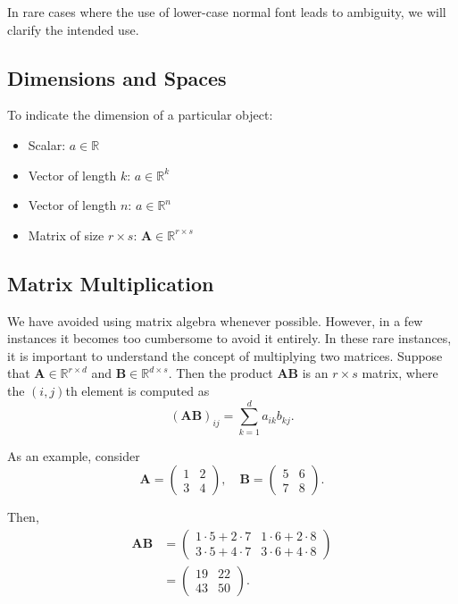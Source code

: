 In rare cases where the use of lower-case normal font leads to ambiguity, we will clarify the intended use.

\subsection{Dimensions and Spaces}

To indicate the dimension of a particular object:

\begin{itemize}
    \item Scalar: \( a \in \mathbb{R} \)
    \item Vector of length \( k \): \( a \in \mathbb{R}^k \)
    \item Vector of length \( n \): \( a \in \mathbb{R}^n \)
    \item Matrix of size \( r \times s \): \( \mathbf{A} \in \mathbb{R}^{r \times s} \)
\end{itemize}

\subsection{Matrix Multiplication}

We have avoided using matrix algebra whenever possible. However, in a few instances it becomes too cumbersome to avoid it entirely. In these rare instances, it is important to understand the concept of multiplying two matrices. Suppose that \( \mathbf{A} \in \mathbb{R}^{r \times d} \) and \( \mathbf{B} \in \mathbb{R}^{d \times s} \). Then the product \( \mathbf{A}\mathbf{B} \) is an \( r \times s \) matrix, where the \( (i,j) \)th element is computed as
\[
(\mathbf{A}\mathbf{B})_{ij} = \sum_{k=1}^{d} a_{ik} b_{kj}.
\]

As an example, consider
\[
\mathbf{A} = 
\begin{pmatrix}
1 & 2 \\
3 & 4
\end{pmatrix}, \quad
\mathbf{B} = 
\begin{pmatrix}
5 & 6 \\
7 & 8
\end{pmatrix}.
\]

Then,
\begin{align*}
\mathbf{A}\mathbf{B} &= 
\begin{pmatrix}
1 \cdot 5 + 2 \cdot 7 & 1 \cdot 6 + 2 \cdot 8 \\
3 \cdot 5 + 4 \cdot 7 & 3 \cdot 6 + 4 \cdot 8
\end{pmatrix} \\
&=
\begin{pmatrix}
19 & 22 \\
43 & 50
\end{pmatrix}.
\end{align*}

